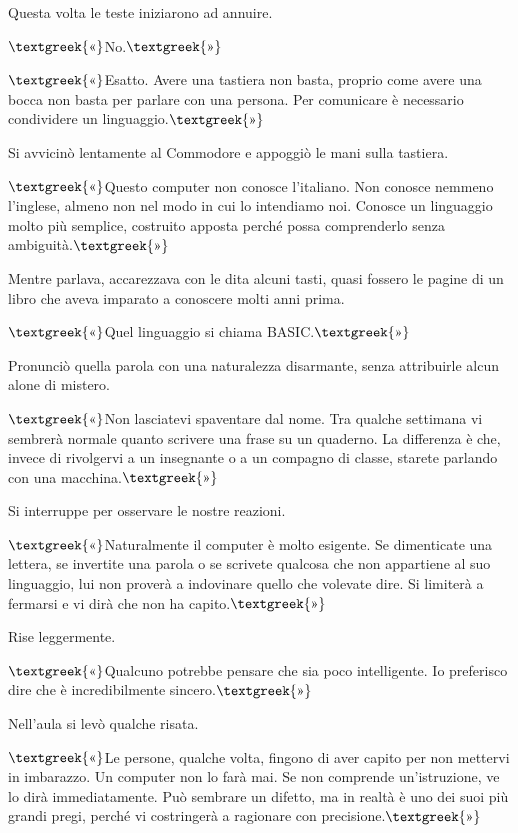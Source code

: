 \documentclass{article}
\begin{document}
Questa volta le teste iniziarono ad annuire.

$\text{\textgreek{«}}$No.$\text{\textgreek{»}}$

$\text{\textgreek{«}}$Esatto. Avere una tastiera non basta, proprio come avere una bocca non basta per parlare con una
persona. Per comunicare è necessario condividere un linguaggio.$\text{\textgreek{»}}$

Si avvicinò lentamente al Commodore e appoggiò le mani sulla tastiera.

$\text{\textgreek{«}}$Questo computer non conosce l'italiano. Non conosce nemmeno l'inglese, almeno non nel modo in cui
lo intendiamo noi. Conosce un linguaggio molto più semplice, costruito apposta perché possa comprenderlo senza
ambiguità.$\text{\textgreek{»}}$

Mentre parlava, accarezzava con le dita alcuni tasti, quasi fossero le pagine di un libro che aveva imparato a conoscere
molti anni prima.

$\text{\textgreek{«}}$Quel linguaggio si chiama BASIC.$\text{\textgreek{»}}$

Pronunciò quella parola con una naturalezza disarmante, senza attribuirle alcun alone di mistero.

$\text{\textgreek{«}}$Non lasciatevi spaventare dal nome. Tra qualche settimana vi sembrerà normale quanto scrivere una
frase su un quaderno. La differenza è che, invece di rivolgervi a un insegnante o a un compagno di classe, starete
parlando con una macchina.$\text{\textgreek{»}}$

Si interruppe per osservare le nostre reazioni.

$\text{\textgreek{«}}$Naturalmente il computer è molto esigente. Se dimenticate una lettera, se invertite una parola o
se scrivete qualcosa che non appartiene al suo linguaggio, lui non proverà a indovinare quello che volevate dire. Si
limiterà a fermarsi e vi dirà che non ha capito.$\text{\textgreek{»}}$

Rise leggermente.

$\text{\textgreek{«}}$Qualcuno potrebbe pensare che sia poco intelligente. Io preferisco dire che è incredibilmente
sincero.$\text{\textgreek{»}}$

Nell'aula si levò qualche risata.

$\text{\textgreek{«}}$Le persone, qualche volta, fingono di aver capito per non mettervi in imbarazzo. Un computer non
lo farà mai. Se non comprende un'istruzione, ve lo dirà immediatamente. Può sembrare un difetto, ma in realtà è uno dei
suoi più grandi pregi, perché vi costringerà a ragionare con precisione.$\text{\textgreek{»}}$
\end{document}
